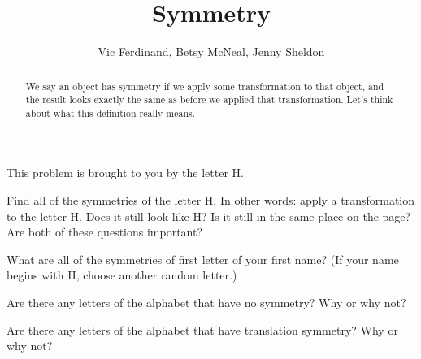 \documentclass[nooutcomes]{ximera}
\title{Symmetry}
\author{Vic Ferdinand, Betsy McNeal, Jenny Sheldon}
\begin{document}
\begin{abstract}
We say an object has symmetry if we apply some transformation to that object, and the result looks exactly the same as before we applied that transformation.  Let's think about what this definition really means.
\end{abstract}
\maketitle



\begin{problem}
This problem is brought to you by the letter H.

\begin{center}
\end{center}
Find all of the symmetries of the letter H.  In other words: apply a transformation to the letter H.  Does it still look like H?  Is it still in the same place on the page?  Are both of these questions important?


\end{problem}

\begin{problem}
What are all of the symmetries of first letter of your first name?  (If your name begins with H, choose another random letter.)


\end{problem}

\begin{problem} \label{Symmetry3}
Are there any letters of the alphabet that have no symmetry?  Why or why not?

\end{problem}

\begin{problem}
Are there any letters of the alphabet that have translation symmetry?  Why or why not?

\end{problem}
\end{document}
